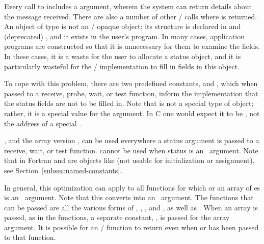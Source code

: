 Every call to  includes a  argument, wherein
the system can return details about the message received.
There are also a number of other \MPI/ calls
where  is returned.
An object of type
is not an \mpi/ opaque object; its structure is declared
in  and (deprecated) , and it exists in the user's program.  In many
cases, application programs are constructed so that it is unnecessary for them
to examine the  fields.  In these cases, it is a waste for the user
to allocate a status object, and it is particularly wasteful for the \mpi/
implementation to fill in fields in this object.


To cope with this problem, there are two predefined constants,
 and
,
which when
passed to a receive,
probe,
wait, or test function, inform the implementation that
the status fields are not to be filled in.  Note that
 is not a special type of 
object; rather, it is a special value for the argument.  In C one would expect
it to be , not the address of a special .

, and the array version
, can be used everywhere a status argument is
passed to a receive, wait, or test function.  
cannot be used when status is an \IN\ argument.
Note that in Fortran  and  are
objects like  (not usable for initialization or
assignment), see Section~\ref{subsec:named-constants}.




In general, this optimization can apply to all functions for which
 or an array of es is an \OUT\ argument.
Note that this converts  into an \INOUT\ argument.
The functions that can be passed  are all the various forms of
,
,
, and , as well as
.
When an array is passed, as in the
functions, a separate constant, , is passed for
the array argument.
It is possible for an \MPI/ function to return 
even when  or  has
been passed to that function.



